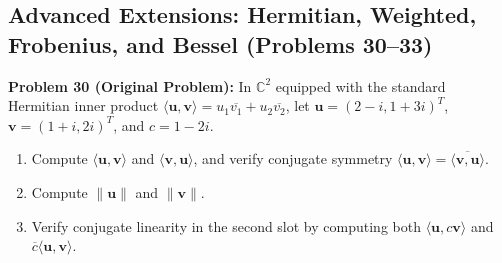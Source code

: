\documentclass[11pt, letterpaper]{article}
\theoremstyle{definition}
\theoremstyle{remark}
\begin{document}
\subsection{Advanced Extensions: Hermitian, Weighted, Frobenius, and Bessel (Problems 30--33)}

\textbf{Problem 30 (Original Problem):} In $\mathbb{C}^2$ equipped with the standard Hermitian inner product $\langle \mathbf{u}, \mathbf{v} \rangle = u_1\overline{v_1} + u_2\overline{v_2}$, let $\mathbf{u} = (2 - i, 1 + 3i)^T$, $\mathbf{v} = (1 + i, 2i)^T$, and $c = 1 - 2i$.
\begin{enumerate}[label=(\alph*)]
    \item Compute $\langle \mathbf{u}, \mathbf{v} \rangle$ and $\langle \mathbf{v}, \mathbf{u} \rangle$, and verify conjugate symmetry $\langle \mathbf{u}, \mathbf{v} \rangle = \overline{\langle \mathbf{v}, \mathbf{u} \rangle}$.
    \item Compute $\|\mathbf{u}\|$ and $\|\mathbf{v}\|$.
    \item Verify conjugate linearity in the second slot by computing both $\langle \mathbf{u}, c\mathbf{v} \rangle$ and $\overline{c}\langle \mathbf{u}, \mathbf{v} \rangle$.
\end{enumerate}
\end{document}
